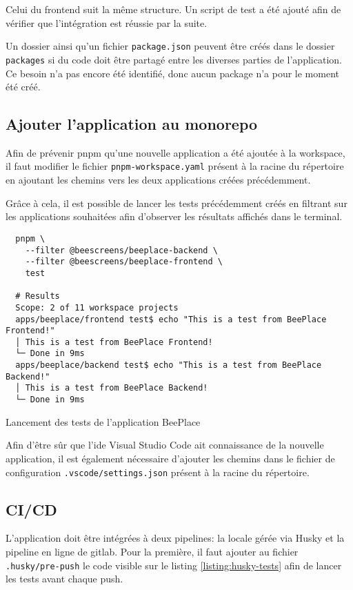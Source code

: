 Celui du frontend suit la même structure. Un script de test a été ajouté afin de vérifier que l'intégration est réussie par la suite.

Un dossier ainsi qu'un fichier \texttt{package.json} peuvent être créés dans le dossier \texttt{packages} si du code doit être partagé entre les diverses parties de l'application. Ce besoin n'a pas encore été identifié, donc aucun package n'a pour le moment été créé.

\subsection{Ajouter l'application au monorepo}

Afin de prévenir \gls{pnpm} qu'une nouvelle application a été ajoutée à la workspace, il faut modifier le fichier \texttt{pnpm-workspace.yaml} présent à la racine du répertoire en ajoutant les chemins vers les deux applications créées précédemment.

Grâce à cela, il est possible de lancer les tests précédemment créés en filtrant sur les applications souhaitées afin d'observer les résultats affichés dans le terminal.

\begin{listing}[H]
  \begin{verbatim}
  pnpm \
    --filter @beescreens/beeplace-backend \
    --filter @beescreens/beeplace-frontend \
    test

  # Results
  Scope: 2 of 11 workspace projects
  apps/beeplace/frontend test$ echo "This is a test from BeePlace Frontend!"
  │ This is a test from BeePlace Frontend!
  └─ Done in 9ms
  apps/beeplace/backend test$ echo "This is a test from BeePlace Backend!"
  │ This is a test from BeePlace Backend!
  └─ Done in 9ms
\end{verbatim}
  \caption{Lancement des tests de l'application BeePlace}
  \label{listing:beeplace-tests}
\end{listing}

Afin d'être sûr que l'\gls{ide} Visual Studio Code ait connaissance de la nouvelle application, il est également nécessaire d'ajouter les chemins dans le fichier de configuration \texttt{.vscode/settings.json} présent à la racine du répertoire.

\subsection{CI/CD}

L'application doit être intégrées à deux pipelines: la locale gérée via Husky et la pipeline en ligne de \gls{gitlab}. Pour la première, il faut ajouter au fichier \texttt{.husky/pre-push} le code visible sur le listing \ref{listing:husky-tests} afin de lancer les tests avant chaque push.

